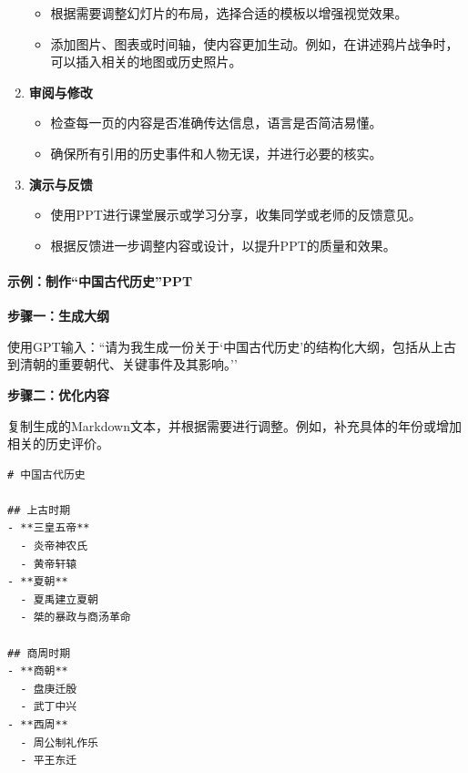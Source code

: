 \begin{enumerate}
\begin{itemize}
          \item
                根据需要调整幻灯片的布局，选择合适的模板以增强视觉效果。
          \item
                添加图片、图表或时间轴，使内容更加生动。例如，在讲述鸦片战争时，可以插入相关的地图或历史照片。
        \end{itemize}
  \item
        \textbf{审阅与修改}

        \begin{itemize}

          \item
                检查每一页的内容是否准确传达信息，语言是否简洁易懂。
          \item
                确保所有引用的历史事件和人物无误，并进行必要的核实。
        \end{itemize}
  \item
        \textbf{演示与反馈}

        \begin{itemize}

          \item
                使用PPT进行课堂展示或学习分享，收集同学或老师的反馈意见。
          \item
                根据反馈进一步调整内容或设计，以提升PPT的质量和效果。
        \end{itemize}
\end{enumerate}

\hypertarget{ux793aux4f8bux5236ux4f5cux4e2dux56fdux53e4ux4ee3ux5386ux53f2ppt}{%
  \paragraph{示例：制作``中国古代历史''PPT}\label{ux793aux4f8bux5236ux4f5cux4e2dux56fdux53e4ux4ee3ux5386ux53f2ppt}}

\textbf{步骤一：生成大纲}

使用GPT输入：``请为我生成一份关于`中国古代历史'的结构化大纲，包括从上古到清朝的重要朝代、关键事件及其影响。''

\textbf{步骤二：优化内容}

复制生成的Markdown文本，并根据需要进行调整。例如，补充具体的年份或增加相关的历史评价。

\begin{lstlisting}
# 中国古代历史

## 上古时期
- **三皇五帝**
  - 炎帝神农氏
  - 黄帝轩辕
- **夏朝**
  - 夏禹建立夏朝
  - 桀的暴政与商汤革命

## 商周时期
- **商朝**
  - 盘庚迁殷
  - 武丁中兴
- **西周**
  - 周公制礼作乐
  - 平王东迁
\end{lstlisting}

